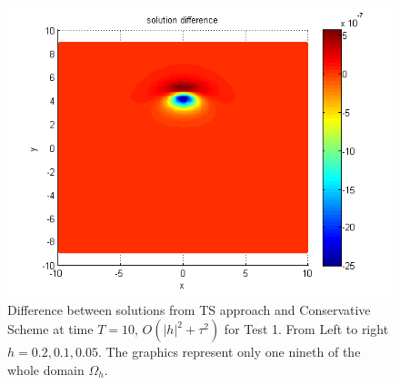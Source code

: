 \documentclass[%
 aip,
cp,  %
 amsmath,amssymb,%
 reprint,%
]{revtex4-2}
\begin{document}
\begin{figure}[ht]
\begin{minipage}[b]{0.32\linewidth}
	\end{minipage}	
	\begin{minipage}[b]{0.32\linewidth}		
		\includegraphics[width=\linewidth]{figures/compare_30_bt3_c045_h005.png}
	\end{minipage}
\caption{Difference between solutions from TS approach and Conservative Scheme at time $T=10$, $O(|h|^2 + \tau^2)$ for Test 1. From Left to right $h=0.2, 0.1, 0.05$. The graphics represent only one nineth of the whole domain $\Omega_h$.}
\label{Test1_Diff}
\end{figure}
\end{document}
